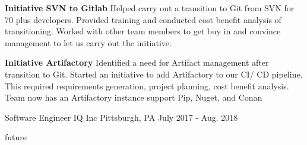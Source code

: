 \begin{cventries}
{\begin{cvitems}
{\begin{itemize}
    \end{itemize} 
}
\item 
{
    \textbf{Initiative SVN to Gitlab} Helped carry out a transition to Git from SVN for 70 plus developers. Provided training and conducted cost benefit analysis 
    of transitioning. Worked with other team members to get buy in and convince management to let us carry out the initiative.
}
\item 
{
    \textbf{Initiative Artifactory} Identified a need for Artifact management after transition to Git. Started an initiative to add Artifactory to our CI/ CD pipeline. 
    This required requirements generation, project planning, cost benefit analysis. Team now has an Artifactory instance support Pip, Nuget, and Conan
}
\end{cvitems}
}



\cventry
{Software Engineer} %
{IQ Inc} %
{Pittsburgh, PA } %
{July 2017 - Aug. 2018} %
{ %
\begin{cvitems}
\item {future}
\end{cvitems}
}




\end{cventries}